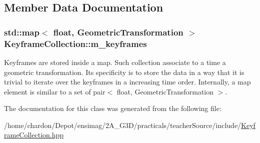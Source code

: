 \subsection{Member Data Documentation}
\hypertarget{classKeyframeCollection_a157e3b47f4d1016d0f62ccb8abc5bc82}{
\subsubsection[{m\+\_\+keyframes}]{\setlength{\rightskip}{0pt plus 5cm}std\+::map$<$ float, {\bf Geometric\+Transformation} $>$ Keyframe\+Collection\+::m\+\_\+keyframes\hspace{0.3cm}{\ttfamily [private]}}}\label{classKeyframeCollection_a157e3b47f4d1016d0f62ccb8abc5bc82}
Keyframes are stored inside a map. Such collection associate to a time a geometric transformation. Its specificity is to store the data in a way that it is trivial to iterate over the keyframes in a increasing time order. Internally, a map element is similar to a set of pair$<$ float, Geometric\+Transformation $>$. 

The documentation for this class was generated from the following file\+:\begin{DoxyCompactItemize}
\item 
/home/chardon/\+Depot/ensimag/2\+A\+\_\+\+G3\+D/practicals/teacher\+Source/include/\hyperlink{KeyframeCollection_8hpp}{Keyframe\+Collection.\+hpp}\end{DoxyCompactItemize}
